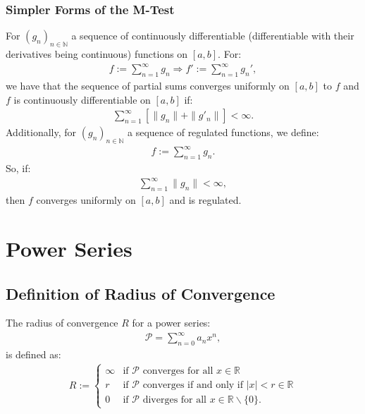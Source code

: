 \documentclass[a4paper, 12pt, twoside]{article}
\begin{document}
\newpage

\subsubsection{Simpler Forms of the M-Test}

For $(g_n)_{n\in\mathbb{N}}$ a sequence of continuously differentiable (differentiable
with their derivatives being continuous) functions on $[a, b]$. For:
\begin{align*}
      f := \sum_{n = 1}^\infty g_n \Rightarrow f' := \sum_{n = 1}^\infty g_n',
\end{align*}
we have that the sequence of partial sums converges uniformly on $[a, b]$
to $f$ and $f$ is continuously differentiable on $[a, b]$ if:
\begin{align*}
      \sum_{n = 1}^\infty \left[\|g_n\| + \|g'_n\|\right] < \infty.
\end{align*}
Additionally, for $(g_n)_{n\in\mathbb{N}}$ a sequence of regulated functions,
we define:
\begin{align*}
      f := \sum_{n = 1}^\infty g_n.
\end{align*}
So, if:
\begin{align*}
      \sum_{n = 1}^\infty \|g_n\| < \infty,
\end{align*}
then $f$ converges uniformly on $[a, b]$ and is regulated.

\section{Power Series}

\subsection{Definition of Radius of Convergence}

The radius of convergence $R$ for a power series:
\begin{align*}
      \mathcal{P} = \sum_{n = 0}^\infty a_nx^n,
\end{align*}
is defined as:
\begin{align*}
      R := \begin{cases}
            \infty & \text{if $\mathcal{P}$ converges for all } x \in \mathbb{R}                \\
            r      & \text{if $\mathcal{P}$ converges if and only if } |x| < r \in \mathbb{R}   \\
            0      & \text{if $\mathcal{P}$ diverges for all } x \in \mathbb{R}\backslash\{0\}.
      \end{cases}
\end{align*}
\end{document}
